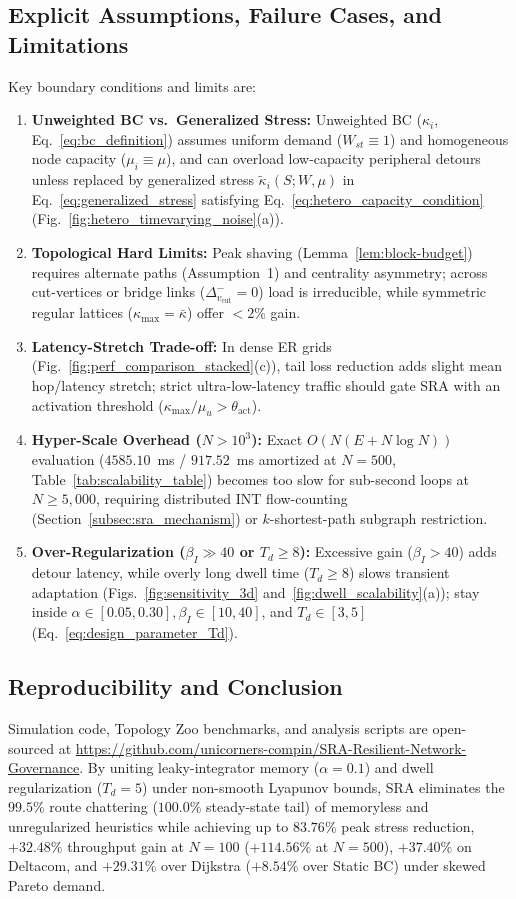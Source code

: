 \documentclass[journal]{IEEEtran}
\theoremstyle{plain}
\theoremstyle{definition}
\newcommand{\rev}[1]{{\color{blue}#1}}
\begin{document}
\rev{\subsection{Explicit Assumptions, Failure Cases, and Limitations}
\label{subsec:limitations}

Key boundary conditions and limits are:
\begin{enumerate}
    \item \textbf{Unweighted BC vs.\ Generalized Stress:} Unweighted BC ($\kappa_i$, Eq.~\eqref{eq:bc_definition}) assumes uniform demand ($W_{st} \equiv 1$) and homogeneous node capacity ($\mu_i \equiv \mu$), and can overload low-capacity peripheral detours unless replaced by generalized stress $\widetilde{\kappa}_i(S; W, \mu)$ in Eq.~\eqref{eq:generalized_stress} satisfying Eq.~\eqref{eq:hetero_capacity_condition} (Fig.~\ref{fig:hetero_timevarying_noise}(a)).
    \item \textbf{Topological Hard Limits:} Peak shaving (Lemma~\ref{lem:block-budget}) requires alternate paths (Assumption~1) and centrality asymmetry; across cut-vertices or bridge links ($\Delta_{v_{\text{cut}}}^- = 0$) load is irreducible, while symmetric regular lattices ($\kappa_{\max}=\bar{\kappa}$) offer $<2\%$ gain.
    \item \textbf{Latency-Stretch Trade-off:} In dense ER grids (Fig.~\ref{fig:perf_comparison_stacked}(c)), tail loss reduction adds slight mean hop/latency stretch; strict ultra-low-latency traffic should gate SRA with an activation threshold ($\kappa_{\max}/\mu_u > \theta_{\text{act}}$).
    \item \textbf{Hyper-Scale Overhead ($N > 10^3$):} Exact $O(N(E + N\log N))$ evaluation ($4585.10$~ms / $917.52$~ms amortized at $N=500$, Table~\ref{tab:scalability_table}) becomes too slow for sub-second loops at $N \ge 5{,}000$, requiring distributed INT flow-counting (Section~\ref{subsec:sra_mechanism}) or $k$-shortest-path subgraph restriction.
    \item \textbf{Over-Regularization ($\beta_I \gg 40$ or $T_d \ge 8$):} Excessive gain ($\beta_I > 40$) adds detour latency, while overly long dwell time ($T_d \ge 8$) slows transient adaptation (Figs.~\ref{fig:sensitivity_3d} and~\ref{fig:dwell_scalability}(a)); stay inside $\alpha \in [0.05, 0.30], \beta_I \in [10, 40]$, and $T_d \in [3, 5]$ (Eq.~\eqref{eq:design_parameter_Td}).
\end{enumerate}

\subsection{Reproducibility and Conclusion}
Simulation code, Topology Zoo benchmarks, and analysis scripts are open-sourced at \url{https://github.com/unicorners-compin/SRA-Resilient-Network-Governance}. By uniting leaky-integrator memory ($\alpha=0.1$) and dwell regularization ($T_d=5$) under non-smooth Lyapunov bounds, SRA eliminates the $99.5\%$ route chattering ($100.0\%$ steady-state tail) of memoryless and unregularized heuristics while achieving up to $83.76\%$ peak stress reduction, $+32.48\%$ throughput gain at $N=100$ ($+114.56\%$ at $N=500$), $+37.40\%$ on Deltacom, and $+29.31\%$ over Dijkstra ($+8.54\%$ over Static BC) under skewed Pareto demand.}



\end{document}
